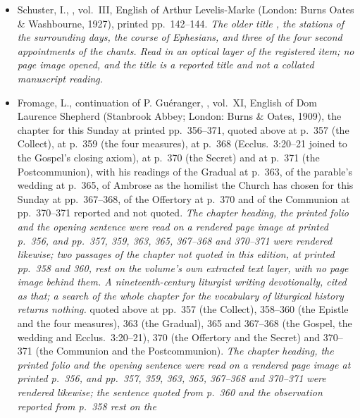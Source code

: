 \begin{itemize}[leftmargin=1.2em, itemsep=0.15em]
522, read on the page image of leaf n264, one of seven page images of leaves
n261--n267 of the Internet Archive digitisation. \textit{The Gospel under  paired with
Ephesians 4:1--6; the headings read at high zoom because the optical text
mangles the numerals.}
\item Schuster, I., , vol.~III,
English of Arthur Levelis-Marke (London: Burns Oates \& Washbourne, 1927),
printed pp.~142--144. \textit{The older title , the stations of the surrounding days, the course of Ephesians, and
three of the four second appointments of the chants. Read in an optical layer of
the registered item; no page image opened, and the title is a reported title and
not a collated manuscript reading.}
\item Fromage, L., continuation of P. Guéranger, ,
vol.~XI, English of Dom Laurence Shepherd (Stanbrook Abbey; London: Burns \&
Oates, 1909), the chapter for this Sunday at printed
pp.~356--371,%
\ifdefined\TriptychSynthesisEdition{} quoted above at p.~357 (the Collect), at
p.~359 (the four measures), at p.~368 (Ecclus.~3:20--21
joined to the Gospel's closing axiom), at p.~370 (the Secret) and at p.~371 (the
Postcommunion), with his readings of the Gradual at p.~363, of the parable's
wedding at p.~365, of Ambrose as the homilist the Church has chosen for this
Sunday at pp.~367--368, of the Offertory at p.~370 and of the Communion at
pp.~370--371 reported and not quoted. \textit{The chapter heading, the printed folio
and the opening sentence were read on a rendered page image at printed p.~356,
and pp.~357, 359, 363, 365, 367--368 and 370--371 were rendered likewise; two
passages of the chapter not quoted in this edition, at printed pp.~358 and 360,
rest on the volume's own extracted text layer, with no page image behind them. A
nineteenth-century liturgist writing devotionally, cited as that; a search of the
whole chapter for the vocabulary of liturgical history returns nothing.}%
\else{} quoted above at pp.~357 (the Collect), 358--360 (the Epistle and
the four measures), 363 (the Gradual), 365 and 367--368 (the Gospel, the wedding
and Ecclus.~3:20--21), 370 (the Offertory and the Secret) and 370--371 (the
Communion and the Postcommunion). \textit{The chapter heading, the printed folio
and the opening sentence were read on a rendered page image at printed p.~356,
and pp.~357, 359, 363, 365, 367--368 and 370--371 were rendered likewise; the
sentence quoted from p.~360 and the observation reported from p.~358 rest on the
}
\end{itemize}
